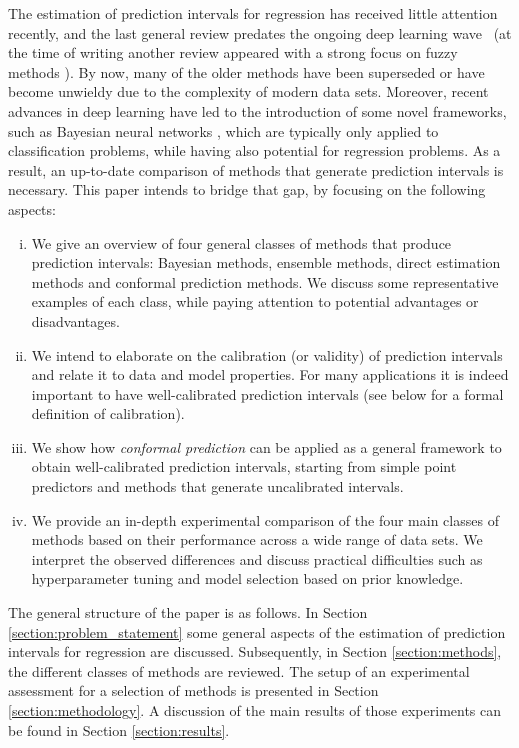 \documentclass[smallcondensed]{svjour3}
\begin{document}
    The estimation of prediction intervals for regression has received little attention recently, and the last general review predates the ongoing deep learning wave~\cite{khosravi2011comprehensive} (at the time of writing another review appeared with a strong focus on fuzzy methods \cite{cartagena2021review}). By now, many of the older methods have been superseded or have become unwieldy due to the complexity of modern data sets. Moreover, recent advances in deep learning have led to the introduction of some novel frameworks, such as Bayesian neural networks \cite{goan2020bayesian}, which are typically only applied to classification problems, while having also potential for regression problems. As a result, an up-to-date comparison of methods that generate prediction intervals is necessary. This paper intends to bridge that gap, by focusing on the following aspects:

    \begin{enumerate}[i)]
        \item We give an overview of four general classes of methods that produce prediction intervals: Bayesian methods, ensemble methods, direct estimation methods and conformal prediction methods. We discuss some representative examples of each class, while paying attention to potential advantages or disadvantages.
        \item We intend to elaborate on the calibration (or validity) of prediction intervals and relate it to data and model properties. For many applications it is indeed important to have well-calibrated prediction intervals (see below for a formal definition of calibration).
        \item We show how \textit{conformal prediction} can be applied as a general framework to obtain well-calibrated prediction intervals, starting from simple point predictors and methods that generate uncalibrated intervals.
        \item We provide an in-depth experimental comparison of the four main classes of methods based on their performance across a wide range of data sets. We interpret the observed differences and discuss practical difficulties such as hyperparameter tuning and model selection based on prior knowledge.
    \end{enumerate}
    The general structure of the paper is as follows. In Section \ref{section:problem_statement} some general aspects of the estimation of prediction intervals for regression are discussed. Subsequently, in Section \ref{section:methods}, the different classes of methods are reviewed. The setup of an experimental assessment for a selection of methods is presented in Section \ref{section:methodology}. A discussion of the main results of those experiments can be found in Section \ref{section:results}.
\end{document}
